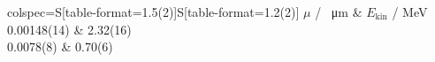 \begin{tblr}{colspec={S[table-format=1.5(2)]S[table-format=1.2(2)]}}
	{{{$\mu$ / \si{\per\um}}}} & {{{$E_{\mathrm{kin}}$ / \si{\mega\electronvolt}}}} \\
	0.00148(14)                & 2.32(16)                                           \\
	0.0078(8)                  & 0.70(6)                                            \\
\end{tblr}
